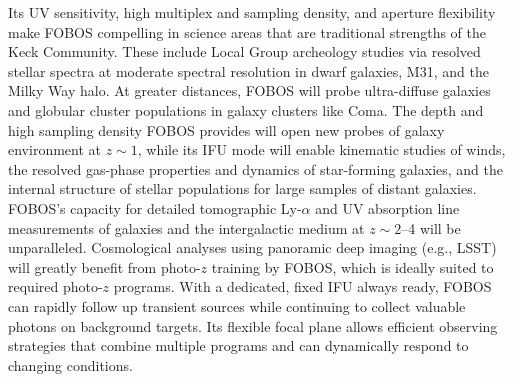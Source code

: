 Its UV sensitivity, high multiplex and sampling density, and aperture flexibility make FOBOS compelling in science
areas that are traditional strengths of the Keck Community.  These include Local Group archeology studies via resolved
stellar spectra at moderate spectral resolution in dwarf galaxies, M31, and the Milky Way halo.  At greater distances, FOBOS will probe ultra-diffuse galaxies and globular cluster populations in galaxy clusters like Coma.  The depth and high sampling density FOBOS provides will open new probes of galaxy environment at $z \sim 1$,
while its IFU mode will enable kinematic studies of winds, the resolved gas-phase properties and dynamics of
star-forming galaxies, and the internal structure of stellar populations for large samples of distant galaxies.  FOBOS's capacity for detailed tomographic Ly-$\alpha$ and UV absorption line measurements of galaxies and the intergalactic
medium at $z \sim 2$--4 will be unparalleled.  Cosmological analyses using panoramic deep imaging (e.g., LSST) will greatly benefit from photo-$z$ training by FOBOS, which is ideally suited to required photo-$z$ programs.  With a dedicated, fixed IFU always ready, FOBOS can rapidly follow up transient sources while continuing to collect valuable photons on background targets.  Its flexible focal plane allows efficient observing strategies that combine multiple programs and can dynamically respond to changing conditions.





